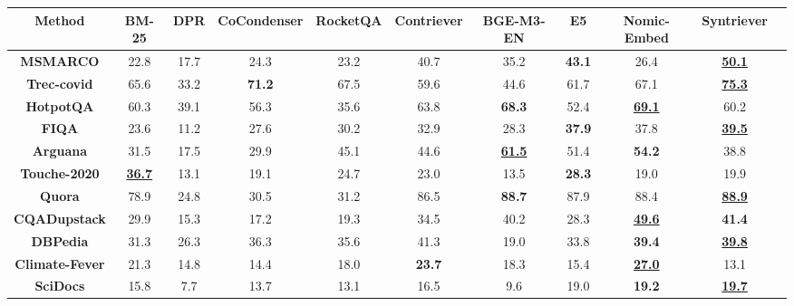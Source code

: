 \begin{table*}[t!]
\begin{adjustbox}{width=1.\textwidth,center}
\begin{tabular}{ccccccccccc}
\hline\textbf{Method}        & BM-25 & DPR   & CoCondenser & RocketQA & Contriever & BGE-M3-EN & E5 & Nomic-Embed  & \textbf{Syntriever} \\\hline
\textbf{MSMARCO}       & 22.8  & 17.7  & 24.3       & 23.2     & 40.7       &    35.2  & \textbf{43.1}    &   26.4           &    \underline{\textbf{50.1}}              \\
\textbf{Trec-covid}    & 65.6  & 33.2  & \textbf{71.2}       & 67.5     & 59.6       & 44.6   & 61.7  & 67.1 &    \underline{\textbf{75.3}}              \\
\textbf{HotpotQA}      & 60.3  & 39.1  & 56.3       & 35.6     & 63.8       &  \textbf{68.3} & 52.4   & \textbf{\underline{69.1}}          &    60.2              \\
\textbf{FIQA}          & 23.6  & 11.2 & 27.6       & 30.2     & 32.9       & 28.3 & \textbf{37.9}   & 37.8             &   \underline{\textbf{39.5}}               \\
\textbf{Arguana}       & 31.5  & 17.5  & 29.9       & 45.1     & 44.6       & \underline{\textbf{61.5}}  & 51.4   & \textbf{54.2}          &   38.8              \\
\textbf{Touche-2020}   & \underline{\textbf{36.7}}  & 13.1  & 19.1       & 24.7     & 23.0       & 13.5 & \textbf{28.3}   & 19.0          &   19.9              \\
\textbf{Quora}         & 78.9  & 24.8  & 30.5       & 31.2     & 86.5       & \textbf{88.7 }& 87.9   &  88.4         &    \underline{\textbf{88.9}}             \\
\textbf{CQADupstack}       &   29.9  &  15.3  &    17.2    &   19.3   &  34.5   &   40.2  &  28.3   &      \underline{\textbf{49.6}}     &      \textbf{41.4}           \\
\textbf{DBPedia}       & 31.3  & 26.3  & 36.3       & 35.6     & 41.3   & 19.0    & 33.8   & \textbf{39.4}          &     \underline{\textbf{39.8}}            \\
\textbf{Climate-Fever} & 21.3  & 14.8  & 14.4       & 18.0     & \textbf{23.7}       & 18.3  & 15.4  &   \underline{\textbf{27.0}}            &     13.1            \\
\textbf{SciDocs}       & 15.8  & 7.7   & 13.7       & 13.1     & 16.5       & 9.6  & 19.0   & \textbf{19.2}         &    \underline{\textbf{19.7}}             \\

\end{tabular}
\end{adjustbox}
\end{table*}
